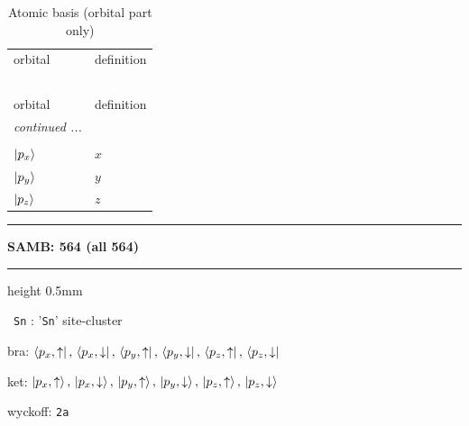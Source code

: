 \documentclass[fleqn,10pt,landscape]{jsarticle}
\begin{document}
\begin{longtable}[l]{ll}
\captionsetup{justification=raggedright, singlelinecheck=off}
\caption{Atomic basis (orbital part only)}
 \\
 \hline \hline
orbital & definition \\ \hline \endfirsthead

\multicolumn{1}{l}{\tablename\ \thetable{}} \\
 \hline \hline
orbital & definition \\ \hline \endhead

 \hline \hline
\multicolumn{1}{r}{\footnotesize\it continued ...} \\ \endfoot

 \hline \hline
\multicolumn{1}{r}{} \\ \endlastfoot

$ \ket{p_{x}} $ & $ x $ \\
$ \ket{p_{y}} $ & $ y $ \\
$ \ket{p_{z}} $ & $ z $ \\
\end{longtable}
\vspace{5mm}
\noindent \rule[0.5mm]{5mm}{0.5mm}\hspace{3mm}\textbf{SAMB: 564 (all 564)}\hspace{3mm}\leaders\hrule height 0.5mm\hfill\kern0pt
\vspace{3mm}

\vspace{5mm}

\noindent\textbullet\, \texttt{Sn} : '\texttt{Sn}' site-cluster

\noindent\quad * bra: $\bra{p_{x},\uparrow},\, \bra{p_{x},\downarrow},\, \bra{p_{y},\uparrow},\, \bra{p_{y},\downarrow},\, \bra{p_{z},\uparrow},\, \bra{p_{z},\downarrow}$

\noindent\quad * ket: $\ket{p_{x},\uparrow},\, \ket{p_{x},\downarrow},\, \ket{p_{y},\uparrow},\, \ket{p_{y},\downarrow},\, \ket{p_{z},\uparrow},\, \ket{p_{z},\downarrow}$

\noindent\quad * wyckoff: \texttt{2a}
\end{document}
